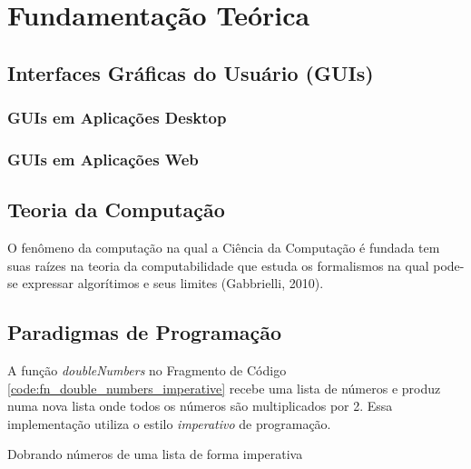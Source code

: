\section{Fundamentação Teórica}
\label{sec:fund-teor}

\subsection{Interfaces Gráficas do Usuário (GUIs)}
\label{sec:guis}

\subsubsection{GUIs em Aplicações Desktop}
\label{sec:guis-desktop}


\subsubsection{GUIs em Aplicações Web}
\label{sec:guis-web}

%
%

\subsection{Teoria da Computação}
\label{sec:teoria-da-computacao}

O fenômeno da computação na qual a Ciência da Computação é fundada tem suas
raízes na teoria da computabilidade que estuda os formalismos na qual pode-se
expressar algorítimos e seus limites (Gabbrielli, 2010).

\subsection{Paradigmas de Programação}
\label{sec:prog_paradigms}

A função \emph{doubleNumbers} no Fragmento de Código
\ref{code:fn_double_numbers_imperative} recebe uma lista de números e produz numa nova
lista onde todos os números são multiplicados por 2. Essa implementação utiliza
o estilo \emph{imperativo} de programação.

\begin{listing}[H]
  \centering
  \caption{Dobrando números de uma lista de forma imperativa}
  \inputminted{js}{code/fn_double_numbers_imperative.js}
  \label{code:fn_double_numbers_imperative}
\end{listing}


